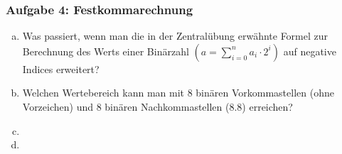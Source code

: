 \begin{frame}
    \frametitle{Aufgabe 4: Festkommarechnung}
    \vspace{0.5cm}

    \begin{enumerate}[(a)]
        \item Was passiert, wenn man die in der Zentralübung erwähnte Formel zur Berechnung
        des Werts einer Binärzahl \( (a = \sum_{i=0}^{n} a_i \cdot 2^i ) \) auf negative Indices erweitert?
        \item Welchen Wertebereich kann man mit 8 binären Vorkommastellen (ohne Vorzeichen)
        und 8 binären Nachkommastellen (8.8) erreichen?
        \item 
        \item 
    \end{enumerate}
\end{frame}


